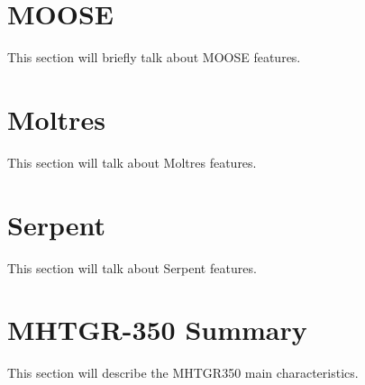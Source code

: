 \section{MOOSE}

This section will briefly talk about MOOSE features.

\section{Moltres}

This section will talk about Moltres features.

\section{Serpent}

This section will talk about Serpent features.

\section{MHTGR-350 Summary}

This section will describe the MHTGR350 main characteristics.

